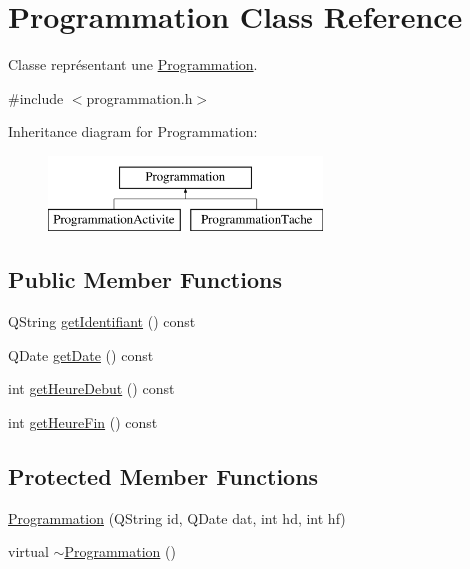 \hypertarget{class_programmation}{}\section{Programmation Class Reference}
\label{class_programmation}


Classe représentant une \hyperlink{class_programmation}{Programmation}.  




{\ttfamily \#include $<$programmation.\+h$>$}

Inheritance diagram for Programmation\+:\begin{figure}[H]
\begin{center}
\leavevmode
\includegraphics[height=2.000000cm]{class_programmation}
\end{center}
\end{figure}
\subsection*{Public Member Functions}
\begin{DoxyCompactItemize}
\item 
Q\+String \hyperlink{class_programmation_a37380f79c4235bfedcbab7c2b9c5de5c}{get\+Identifiant} () const 
\item 
Q\+Date \hyperlink{class_programmation_abd1632dfa907a6bf2a84bfdbc3bef38f}{get\+Date} () const 
\item 
int \hyperlink{class_programmation_a927a5f9c0c752d33d12eb100b9315055}{get\+Heure\+Debut} () const 
\item 
int \hyperlink{class_programmation_a8ebc1580f9e4a3a3317d4a5535e28d8b}{get\+Heure\+Fin} () const 
\end{DoxyCompactItemize}
\subsection*{Protected Member Functions}
\begin{DoxyCompactItemize}
\item 
\hyperlink{class_programmation_a73e7d51291b37140ffb7647bfa0d5ff3}{Programmation} (Q\+String id, Q\+Date dat, int hd, int hf)
\item 
virtual \hyperlink{class_programmation_aa477667deb545f10a3f5d32d7a3df590}{$\sim$\+Programmation} ()
\end{DoxyCompactItemize}
